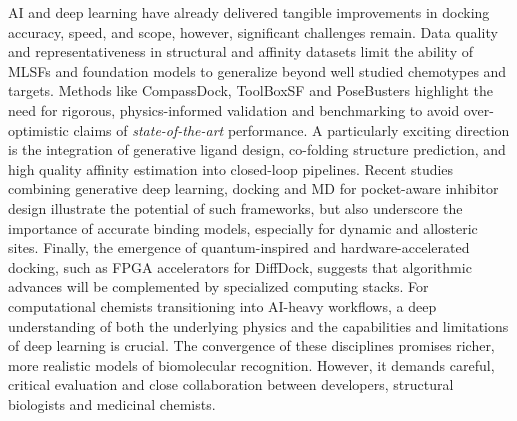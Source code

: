 \documentclass[12pt]{article}
\begin{document}
AI and deep learning have already delivered tangible improvements in docking accuracy, speed, and scope, however, significant challenges remain. Data quality and representativeness in structural and affinity datasets limit the ability of MLSFs and foundation models to generalize beyond well studied chemotypes and targets. Methods like CompassDock\cite{CH13_compassdock2024}, ToolBoxSF\cite{CH13_durant2025robustly} and PoseBusters\cite{CH13_posebusters2023} highlight the need for rigorous, physics-informed validation and benchmarking to avoid over-optimistic claims of \emph{state-of-the-art} performance. A particularly exciting direction is the integration of generative ligand design, co-folding structure prediction, and high quality affinity estimation into closed-loop pipelines. Recent studies combining generative deep learning, docking and MD for pocket-aware inhibitor design illustrate the potential of such frameworks, but also underscore the importance of accurate binding models, especially for dynamic and allosteric sites.\cite{CH13_btkgen2025,CH13_deepallostery2024,CH13_robinson2022artificial} Finally, the emergence of quantum-inspired and hardware-accelerated docking, such as FPGA accelerators for DiffDock, suggests that algorithmic advances will be complemented by specialized computing stacks.\cite{CH13_quantuminspired2024,CH13_diffdockfpga2025} 
For computational chemists transitioning into AI-heavy workflows, a deep understanding of both the underlying physics and the capabilities and limitations of deep learning is crucial. The convergence of these disciplines promises richer, more realistic models of biomolecular recognition. However, it demands careful, critical evaluation and close collaboration between developers, structural biologists and medicinal chemists.


\end{document}
